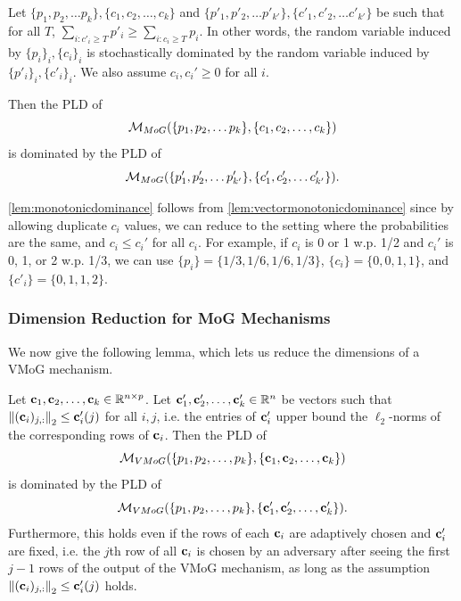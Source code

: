 \begin{cor}\label{lem:monotonicdominance}
Let $\{p_1, p_2, \ldots p_k\}, \{c_1, c_2, \ldots, c_k\}$ and $\{p'_1, p'_2, \ldots p'_{k'}\}, \{c'_1, c'_2, \ldots c'_{k'}\}$ be such that for all $T$, $\sum_{i : c'_i \geq T} p'_i \geq \sum_{i: c_i \geq T} p_i$. In other words, the random variable induced by $\{p_i\}_i, \{c_i\}_i$ is stochastically dominated by the random variable induced by $\{p'_i\}_i, \{c'_i\}_i$. We also assume $c_i, c_i' \geq 0$ for all $i$.

Then the PLD of \[\mathcal{M}_{MoG}(\{p_1, p_2, \ldots p_k\}, \{c_1, c_2, \ldots, c_k\})\] is dominated by the PLD of \[\mathcal{M}_{MoG}(\{p'_1, p'_2, \ldots p'_{k'}\}, \{c'_1, c'_2, \ldots c'_{k'}\}).\]
\end{cor}

\cref{lem:monotonicdominance} follows from \cref{lem:vectormonotonicdominance} since by allowing duplicate $c_i$ values, we can reduce to the setting where the probabilities are the same, and $c_i \leq c_i'$ for all $c_i$. For example, if $c_i$ is 0 or 1 w.p. 1/2 and $c_i'$ is 0, 1, or 2 w.p. 1/3, we can use $\{p_i\} = \{1/3, 1/6, 1/6, 1/3\}$, $\{c_i\} = \{0, 0, 1, 1\}$, and  $\{c'_i\} = \{0, 1, 1, 2\}$.

\subsubsection{Dimension Reduction for MoG Mechanisms}

We now give the following lemma, which lets us reduce the dimensions of a VMoG mechanism.

\begin{lem}\label{lem:scalardominance}
Let $\mathbf{c}_1, \mathbf{c}_2, \ldots, \mathbf{c}_k \in \mathbb{R}^{n \times p}$. Let $\mathbf{c}_1', \mathbf{c}_2', \ldots, \mathbf{c}_k' \in \mathbb{R}^{n}$ be vectors such that $\left\|(\mathbf{c}_i)_{j,:}\right\|_2 \leq \mathbf{c}'_i(j)$ for all $i, j$, i.e. the entries of $\mathbf{c}'_i$ upper bound the $\ell_2$-norms of the corresponding rows of $\mathbf{c}_i$.
Then the PLD of \[\mathcal{M}_{VMoG}(\{p_1, p_2, \ldots, p_k\}, \{\mathbf{c}_1, \mathbf{c}_2, \ldots, \mathbf{c}_k\})\] is dominated by the PLD of \[\mathcal{M}_{VMoG}(\{p_1, p_2, \ldots, p_k\}, \{\mathbf{c}_1', \mathbf{c}_2', \ldots, \mathbf{c}_k'\}).\]
Furthermore, this holds even if the rows of each $\mathbf{c}_i$ are adaptively chosen and $\mathbf{c}_i'$ are fixed, i.e. the $j$th row of all $\mathbf{c}_i$ is chosen by an adversary after seeing the first $j-1$ rows of the output of the VMoG mechanism, as long as the assumption $\left\|(\mathbf{c}_i)_{j,:}\right\|_2 \leq \mathbf{c}'_i(j)$ holds.
\end{lem}

